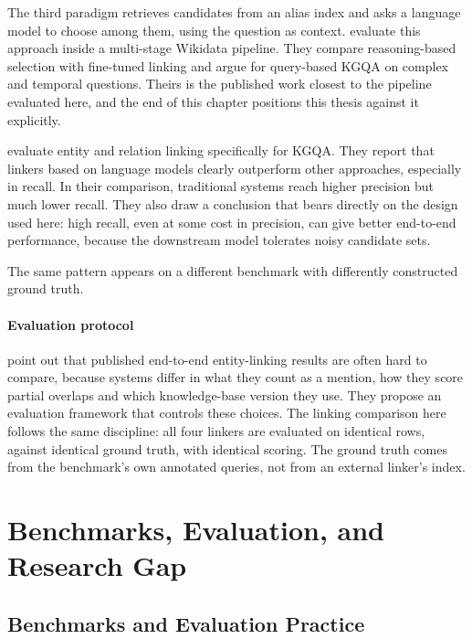 The third paradigm retrieves candidates from an alias index and asks a language model to choose among them, using the question as context.
\citet{alekseev2025querybased} evaluate this approach inside a multi-stage Wikidata pipeline.
They compare reasoning-based selection with fine-tuned linking and argue for query-based KGQA on complex and temporal questions.
Theirs is the published work closest to the pipeline evaluated here, and the end of this chapter positions this thesis against it explicitly.

\citet{vollmers2025evaluation} evaluate entity and relation linking specifically for KGQA.
They report that linkers based on language models clearly outperform other approaches, especially in recall.
In their comparison, traditional systems reach higher precision but much lower recall.
They also draw a conclusion that bears directly on the design used here: high recall, even at some cost in precision, can give better end-to-end performance, because the downstream model tolerates noisy candidate sets.

The same pattern appears on a different benchmark with differently constructed ground truth.

\paragraph{Evaluation protocol}

\citet{bast2023fairel} point out that published end-to-end entity-linking results are often hard to compare, because systems differ in what they count as a mention, how they score partial overlaps and which knowledge-base version they use.
They propose an evaluation framework that controls these choices.
The linking comparison here follows the same discipline: all four linkers are evaluated on identical rows, against identical ground truth, with identical scoring.
The ground truth comes from the benchmark's own annotated queries, not from an external linker's index.

\section{Benchmarks, Evaluation, and Research
Gap}

\subsection{Benchmarks and Evaluation
Practice}

\label{sec:related-eval}

